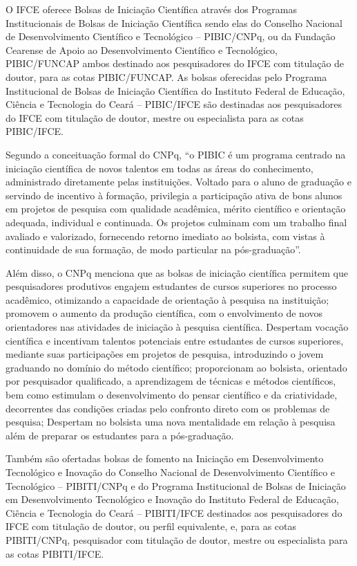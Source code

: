 \documentclass{paper}
\begin{document}
O IFCE oferece Bolsas de Iniciação Científica através dos Programas Institucionais de Bolsas de Iniciação Científica sendo elas do Conselho Nacional de Desenvolvimento Científico e Tecnológico – PIBIC/CNPq, ou da Fundação Cearense de Apoio ao Desenvolvimento Científico e Tecnológico, PIBIC/FUNCAP ambos destinado aos pesquisadores do IFCE com titulação de doutor, para as cotas PIBIC/FUNCAP. As bolsas oferecidas pelo Programa Institucional de Bolsas de Iniciação Científica do Instituto Federal de Educação, Ciência e Tecnologia do Ceará – PIBIC/IFCE são destinadas aos pesquisadores do IFCE com titulação de doutor, mestre ou especialista para as cotas PIBIC/IFCE.

Segundo a conceituação formal do CNPq, ``o PIBIC é um programa centrado na iniciação científica de novos talentos em todas as áreas do conhecimento, administrado diretamente pelas instituições. Voltado para o aluno de graduação e servindo de incentivo à formação, privilegia a participação ativa de bons alunos em projetos de pesquisa com qualidade acadêmica, mérito científico e orientação adequada, individual e continuada. Os projetos culminam com um trabalho final avaliado e valorizado, fornecendo retorno imediato ao bolsista, com vistas à continuidade de sua formação, de modo particular na pós-graduação''.

Além disso, o CNPq menciona que as bolsas de iniciação científica permitem que pesquisadores produtivos engajem estudantes de cursos superiores no processo acadêmico, otimizando a capacidade de orientação à pesquisa na instituição; promovem o aumento da produção científica, com o envolvimento de novos orientadores nas atividades de iniciação à pesquisa científica. Despertam vocação científica e incentivam talentos potenciais entre estudantes de cursos superiores, mediante suas participações em projetos de pesquisa, introduzindo o jovem graduando no domínio do método científico; proporcionam ao bolsista, orientado por pesquisador qualificado, a aprendizagem de técnicas e métodos científicos, bem como estimulam o desenvolvimento do pensar científico e da criatividade, decorrentes das condições criadas pelo confronto direto com os problemas de pesquisa; Despertam no bolsista uma nova mentalidade em relação à pesquisa além de preparar os estudantes para a pós-graduação.

Também são ofertadas bolsas de fomento na Iniciação em Desenvolvimento Tecnológico e Inovação do Conselho Nacional de Desenvolvimento Científico e Tecnológico – PIBITI/CNPq e do Programa Institucional de Bolsas de Iniciação em Desenvolvimento Tecnológico e Inovação do Instituto Federal de Educação, Ciência e Tecnologia do Ceará – PIBITI/IFCE destinados aos pesquisadores do IFCE com titulação de doutor, ou perfil equivalente, e, para as cotas PIBITI/CNPq, pesquisador com titulação de doutor, mestre ou especialista para as cotas PIBITI/IFCE.
\end{document}
